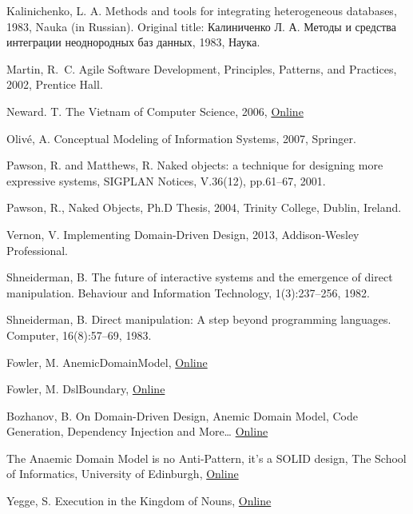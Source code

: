 \documentclass[a4paper,12pt,oneside,openright,final]{memoir} %
\begin{document}
\begin{thebibliography}{5}
Kalinichenko, L. A. Methods and tools for integrating heterogeneous databases, 1983, Nauka (in Russian).
\foreignlanguage{russian}{Original title: Калиниченко Л. А. Методы и средства интеграции неоднородных баз данных, 1983, Наука.}

Martin, R.~C. Agile Software Development, Principles, Patterns, and Practices, 2002, Prentice Hall.

New\-ard. T. The Vietnam of Computer Science, 2006,
\href{http://blogs.tedneward.com/2006/06/26/The+Vietnam+Of+Computer+Science.aspx}{Online}

Oliv\'{e}, A. Conceptual Modeling of Information Systems, 2007, Springer.

Pawson, R. and Matthews, R. Naked objects: a technique for designing more expressive systems, SIGPLAN Notices, V.36(12), pp.61--67, 2001.

Pawson, R., Naked Objects, Ph.D Thesis, 2004, Trinity College, Dublin, Ireland.

Vernon, V. Implementing Domain-Driven Design, 2013, Addison-Wesley Professional.

Shneiderman, B. The future of interactive systems and the emergence of direct manipulation. Behaviour and Information Technology, 1(3):237–256, 1982.

Shneiderman, B. Direct manipulation: A step beyond programming languages. Computer, 16(8):57–69, 1983.

 Fowler, M. AnemicDomainModel, 
\href{http://www.martinfowler.com/bliki/AnemicDomainModel.html}{Online}

 Fowler, M. DslBoundary, 
\href{http://martinfowler.com/bliki/DslBoundary.html}{Online}

 Bozhanov, B. On Domain-Driven Design, Anemic Domain Model, Code Generation, Dependency Injection and More…
\href{http://techblog.bozho.net/on-domain-driven-design-anemic-domain-models-code-generation-dependency-injection-and-more/}{Online}

  The Anaemic Domain Model is no Anti-Pattern, it’s a SOLID design, The School of Informatics, University of Edinburgh,
\href{https://blog.inf.ed.ac.uk/sapm/2014/02/04/the-anaemic-domain-model-is-no-anti-pattern-its-a-solid-design/}{Online}

 Yegge, S. Execution in the Kingdom of Nouns,  
\href{http://steve-yegge.blogspot.com.au/2006/03/execution-in-kingdom-of-nouns.html}{Online}


\end{thebibliography}
\end{document}
